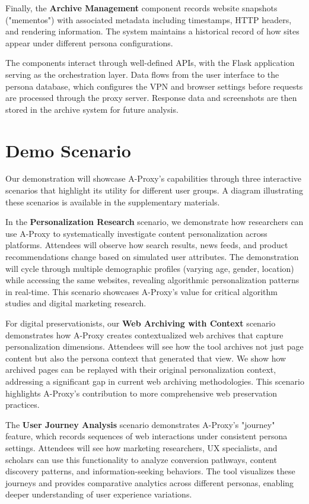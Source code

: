 \documentclass[sigconf]{acmart}
\begin{document}
Finally, the \textbf{Archive Management} component records website snapshots ("mementos") with associated metadata including timestamps, HTTP headers, and rendering information. The system maintains a historical record of how sites appear under different persona configurations.

The components interact through well-defined APIs, with the Flask application serving as the orchestration layer. Data flows from the user interface to the persona database, which configures the VPN and browser settings before requests are processed through the proxy server. Response data and screenshots are then stored in the archive system for future analysis.

\section{Demo Scenario}
Our demonstration will showcase A-Proxy's capabilities through three interactive scenarios that highlight its utility for different user groups. A diagram illustrating these scenarios is available in the supplementary materials.

In the \textbf{Personalization Research} scenario, we demonstrate how researchers can use A-Proxy to systematically investigate content personalization across platforms. Attendees will observe how search results, news feeds, and product recommendations change based on simulated user attributes. The demonstration will cycle through multiple demographic profiles (varying age, gender, location) while accessing the same websites, revealing algorithmic personalization patterns in real-time. This scenario showcases A-Proxy's value for critical algorithm studies and digital marketing research.

For digital preservationists, our \textbf{Web Archiving with Context} scenario demonstrates how A-Proxy creates contextualized web archives that capture personalization dimensions. Attendees will see how the tool archives not just page content but also the persona context that generated that view. We show how archived pages can be replayed with their original personalization context, addressing a significant gap in current web archiving methodologies. This scenario highlights A-Proxy's contribution to more comprehensive web preservation practices.

The \textbf{User Journey Analysis} scenario demonstrates A-Proxy's "journey" feature, which records sequences of web interactions under consistent persona settings. Attendees will see how marketing researchers, UX specialists, and scholars can use this functionality to analyze conversion pathways, content discovery patterns, and information-seeking behaviors. The tool visualizes these journeys and provides comparative analytics across different personas, enabling deeper understanding of user experience variations.
\end{document}
